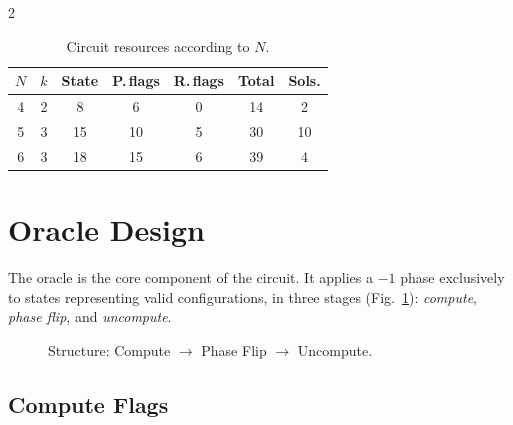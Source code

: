 \documentclass[9pt, a4paper]{extarticle}
\begin{document}
\begin{multicols}{2}
\begin{table}[H]
    \centering
    \caption{Circuit resources according to $N$.}
    \label{tab:resources}
    \scriptsize
    \begin{tabular}{@{}ccccccc@{}}
        \toprule
        $N$ & $k$ & State & P.\,flags & R.\,flags & Total & Sols. \\
        \midrule
        4 & 2 & 8  & 6  & 0 & 14 & 2  \\
        5 & 3 & 15 & 10 & 5 & 30 & 10 \\
        6 & 3 & 18 & 15 & 6 & 39 & 4  \\
        \bottomrule
    \end{tabular}
\end{table}

\section{Oracle Design}

The oracle is the core component of the circuit. It applies a $-1$ phase exclusively to states representing valid configurations, in three stages (Fig.~\ref{fig:oracle}): \emph{compute}, \emph{phase flip}, and \emph{uncompute}.

\begin{figure}[H]
    \centering
    \caption{Structure: Compute $\to$ Phase Flip $\to$ Uncompute.}
    \label{fig:oracle}
\end{figure}

\subsection{Compute Flags}


\end{multicols}
\end{document}
